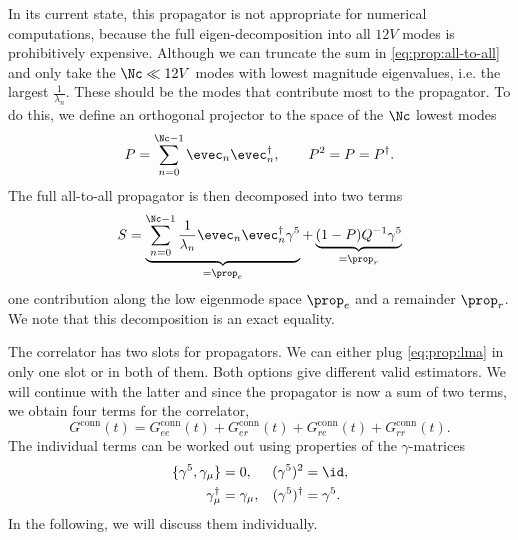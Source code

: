 In its current state, this propagator is not appropriate for numerical computations, because the full eigen-decomposition into all $12V$ modes is prohibitively expensive.
Although we can truncate the sum in \cref{eq:prop:all-to-all} and only take the $\Nc \ll 12 V$ modes with lowest magnitude eigenvalues, i.e. the largest $\frac{1}{\lambda_{n}}$.
These should be the modes that contribute most to the propagator.
To do this, we define an orthogonal projector to the space of the $\Nc$ lowest modes
\begin{equation} \label{eq:lma:projector}
P = \sum_{n=0}^{\Nc-1} \evec_n \evec_n^{\dagger},
\qquad
P^{2} = P = P^{\dagger}.
\end{equation}
The full all-to-all propagator is then decomposed into two terms
\begin{equation} \label{eq:prop:lma}
S
= \underbrace{\sum_{n=0}^{\Nc-1}
  \frac{1}{\lambda_{n}} \evec_{n} \evec_{n}^{\dagger} \gamma^{5}}_{=\prop_e}
+ \underbrace{(1-P) Q^{-1} \gamma^{5}}_{=\prop_r}
\end{equation}
one contribution along the low eigenmode space $\prop_e$ and a remainder $\prop_r$.
We note that this decomposition is an exact equality.

The correlator has two slots for propagators.
We can either plug \cref{eq:prop:lma} in only one slot or in both of them.
Both options give different valid estimators.
We will continue with the latter and since the propagator is now a sum of two terms, we obtain four terms for the correlator,
\begin{equation}
G^{\text{conn}}(t)
= G_{ee}^{\text{conn}}(t)
+ G_{er}^{\text{conn}}(t)
+ G_{re}^{\text{conn}}(t)
+ G_{rr}^{\text{conn}}(t).
\end{equation}
The individual terms can be worked out using properties of the $\gamma$-matrices
\begin{align}
\{\gamma^{5}, \gamma_{\mu}\} &= 0,        &  (\gamma^{5})^{2} &= \id, \\
\gamma_{\mu}^{\dagger} &= \gamma_{\mu},   &  (\gamma^{5})^{\dagger} &= \gamma^{5}.
\end{align}
In the following, we will discuss them individually.

